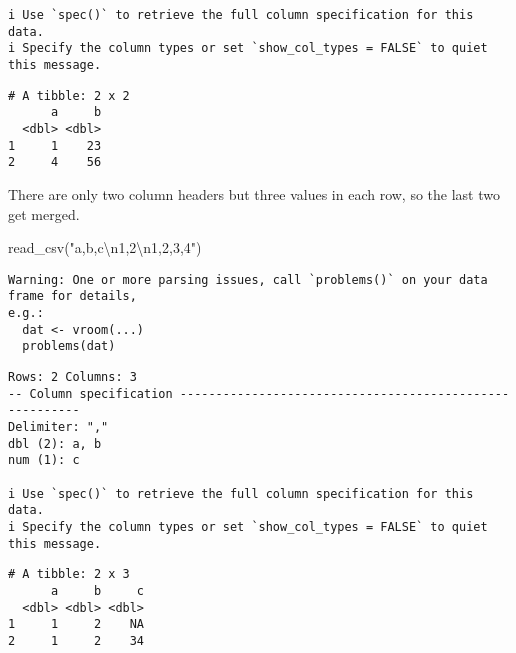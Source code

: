 \documentclass[
  letterpaper,
  DIV=11,
  numbers=noendperiod]{scrreprt}
\newenvironment{Shaded}{\begin{snugshade}}{\end{snugshade}}
\newcommand{\FunctionTok}[1]{\textcolor[rgb]{0.28,0.35,0.67}{#1}}
\newcommand{\NormalTok}[1]{\textcolor[rgb]{0.00,0.23,0.31}{#1}}
\newcommand{\SpecialCharTok}[1]{\textcolor[rgb]{0.37,0.37,0.37}{#1}}
\newcommand{\StringTok}[1]{\textcolor[rgb]{0.13,0.47,0.30}{#1}}
\begin{document}
\begin{enumerate}
\begin{tcolorbox}
\begin{verbatim}
i Use `spec()` to retrieve the full column specification for this data.
i Specify the column types or set `show_col_types = FALSE` to quiet this message.
\end{verbatim}

\begin{verbatim}
# A tibble: 2 x 2
      a     b
  <dbl> <dbl>
1     1    23
2     4    56
\end{verbatim}

  There are only two column headers but three values in each row, so the
  last two get merged.

  \end{tcolorbox}

  \begin{tcolorbox}[enhanced jigsaw, breakable, bottomtitle=1mm, left=2mm, colback=white, toprule=.15mm, leftrule=.75mm, colframe=quarto-callout-note-color-frame, colbacktitle=quarto-callout-note-color!10!white, title={Answer}, coltitle=black, toptitle=1mm, bottomrule=.15mm, opacitybacktitle=0.6, arc=.35mm, rightrule=.15mm, titlerule=0mm, opacityback=0]

\begin{Shaded}
\begin{Highlighting}[]
\FunctionTok{read\_csv}\NormalTok{(}\StringTok{"a,b,c}\SpecialCharTok{\textbackslash{}n}\StringTok{1,2}\SpecialCharTok{\textbackslash{}n}\StringTok{1,2,3,4"}\NormalTok{)}
\end{Highlighting}
\end{Shaded}

\begin{verbatim}
Warning: One or more parsing issues, call `problems()` on your data frame for details,
e.g.:
  dat <- vroom(...)
  problems(dat)
\end{verbatim}

\begin{verbatim}
Rows: 2 Columns: 3
-- Column specification --------------------------------------------------------
Delimiter: ","
dbl (2): a, b
num (1): c

i Use `spec()` to retrieve the full column specification for this data.
i Specify the column types or set `show_col_types = FALSE` to quiet this message.
\end{verbatim}

\begin{verbatim}
# A tibble: 2 x 3
      a     b     c
  <dbl> <dbl> <dbl>
1     1     2    NA
2     1     2    34
\end{verbatim}


\end{tcolorbox}
\end{enumerate}
\end{document}
